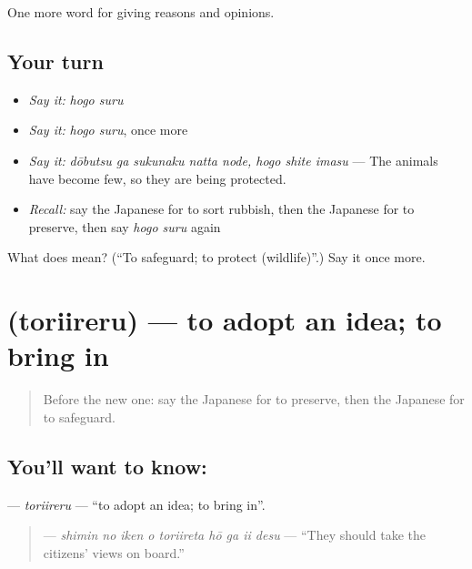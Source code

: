 \begin{grammarlens}[title={What you've built}]
One more word for giving reasons and opinions.
\end{grammarlens}

\subsection*{Your turn}
\begin{itemize}
\raggedright
  \item \emph{Say it:} \emph{hogo suru}
  \item \emph{Say it:} \emph{hogo suru}, once more
  \item \emph{Say it:} \emph{dōbutsu ga sukunaku natta node, hogo shite imasu} — The animals have become few, so they are being protected.
  \item \emph{Recall:} say the Japanese for to sort rubbish, then the Japanese for to preserve, then say \emph{hogo suru} again
\end{itemize}

\begin{tcolorbox}[breakable,colback=teal!4,colframe=teal!35!black,title={Before you move on}]
What does  mean? (\textquotedblleft{}To safeguard; to protect (wildlife)\textquotedblright{}.) Say it once more.
\end{tcolorbox}
\section[\texorpdfstring{\ja{とりいれる} (toriireru)}{とりいれる (toriireru)}]{ (toriireru) — to adopt an idea; to bring in}

\label{lesson:JA-C339-toriireru}



\begin{quote}
Before the new one: say the Japanese for to preserve, then the Japanese for to safeguard.
\end{quote}

\subsection*{You'll want to know: }
\textbf{} — \emph{toriireru} — \textquotedblleft{}to adopt an idea; to bring in\textquotedblright{}.

\begin{quote}
\textbf{    } — \emph{shimin no iken o toriireta hō ga ii desu} — \textquotedblleft{}They should take the citizens' views on board.\textquotedblright{}
\end{quote}

